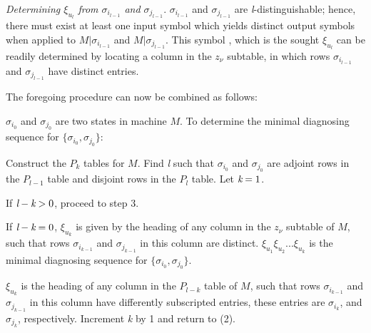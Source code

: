 \emph{Determining $ \xi_{u_{l}}$ from $\sigma_{i_{l-1}}$ and $\sigma_{j_{l-1} }$}. $\sigma_{i_{l-1}}$ and $\sigma_{j_{l-1}}$ are \emph{l}-distinguishable; hence, there must exist at least one input symbol which yields distinct output symbols when applied to $ M|\sigma_{i_{l-1}}$ and $ M|\sigma_{j_{l-1}}$. This symbol , which is the sought $\xi_{u_{l}}$ can be readily determined by locating a column in the $z_\nu$ subtable, in which rows $\sigma_{i_{l-1}}$ and $\sigma_{j_{l-1}}$ have distinct entries.

    The foregoing procedure can now be combined as follows:

\algorithm $\sigma_{i_{0}}$ and $\sigma_{j_{0}}$ are two states in machine $M$. To determine the minimal diagnosing sequence for $ \{  \sigma_{i_{0}}, \sigma_{j_{0}} \} $:  \begin{inparaenum}[ (1) ]
    \item Construct the $P_k$ tables for $M$. Find \emph{l} such that $\sigma_{i_{0}}$ and $\sigma_{j_{0}}$ are adjoint rows in the $P_{l-1}$ table and disjoint rows in the $P_l$ table. Let $\emph{k}=1$.
    \item \begin{inparaenum}[ (a) ]
        \item If $ \emph{l} - \emph{k} > 0 $, proceed to step 3.
        \item If $ \emph{l} - \emph{k} = 0 $, $\xi_{u_{k}}$ is given by the heading of any column in the $z_\nu$ subtable of $M$, such that rows $\sigma_{i_{k-1}}$ and $\sigma_{j_{k-1}}$ in this column are distinct. $\xi_{u_{1}}\xi_{u_{2}}...\xi_{u_{k}}$ is the minimal diagnosing sequence for $ \{  \sigma_{i_{0}}, \sigma_{j_{0}} \} $.
    \end{inparaenum}
\item $\xi_{u_{k}}$ is the heading of any column in the $P_{l-k}$ table of $M$, such that rows $\sigma_{i_{k-1}}$ and $\sigma_{j_{k-1}}$ in this column have differently subscripted entries, these entries are $\sigma_{i_{k}}$, and  $\sigma_{j_{k}}$, respectively. Increment \emph{k} by 1 and return to (2).
\end{inparaenum}

